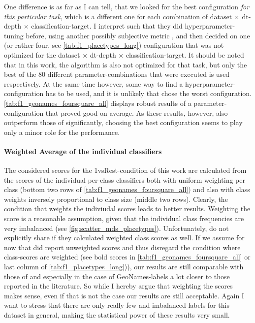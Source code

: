 One difference is as far as I can tell, that we looked for the best configuration \textit{for this particular task}, which is a different one for each combination of dataset $\times$ \gls{dt}-depth $\times$ classification-target. I interpret \mainalgos such that they did hyperparameter-tuning before, using another possibly subjective metric , and then decided on one (or rather four, see \autoref{tab:f1_placetypes_long}) configuration that was not optimized for the dataset $\times$ \gls{dt}-depth $\times$ classification-target. It should be noted that in this work, the algorithm is also not optimized for that task, but only the best of the 80 different parameter-combinations that were executed is used respectively. At the same time however, some  way to find a hyperparameter-configuration has to be used, and it is unlikely that \mainalgos chose the worst configuration. \autoref{tab:f1_geonames_foursquare_all} displays robust results of a parameter-configuration that proved good on average. As these results, however, also outperform those of \mainalgos significantly, choosing the best configuration seems to play only a minor role for the performance.

\paragraph{Weighted Average of the individual classifiers}

The considered scores for the 1vsRest-condition of this work are calculated from the scores of the individual per-class classifiers both with uniform weighting per class (bottom two rows of \autoref{tab:f1_geonames_foursquare_all}) and also with class weights inversely proportional to class size (middle two rows). Clearly, the condition that weights the indiviudal scores leads to better results. Weighting the score is a reasonable assumption, given that the individual class frequencies are very imbalanced (see \autoref{fig:scatter_mds_placetypes}). Unfortunately, \mainalgos do not explicitly share if they calculated weighted class scores as well. If we assume for now that \mainalgos did report unweighted scores and thus disregard the condition where class-scores are weighted (see bold scores in \autoref{tab:f1_geonames_foursquare_all} or last column of \autoref{tab:f1_placetypes_long})), our results are still comparable with those of \mainalgos and especially in the case of GeoNames-labels a lot closer to those reported in the literature. So while I hereby argue that weighting the scores makes sense, even if that is not the case our results are still acceptable. Again I want to stress that there are only really few and imbalanced labels for this dataset in general, making the statistical power of these results very small.

